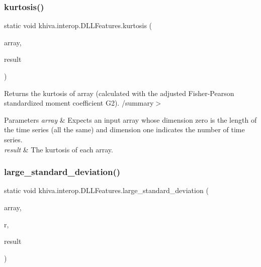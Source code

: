 \mbox{\label{classkhiva_1_1interop_1_1_d_l_l_features_a97470f56bfa5bd147e77adeab9bb6873}} 
\subsubsection{\texorpdfstring{kurtosis()}{kurtosis()}}
{\footnotesize\ttfamily static void khiva.\+interop.\+D\+L\+L\+Features.\+kurtosis (\begin{DoxyParamCaption}\item[{\mbox{[}\+In\mbox{]} ref Int\+Ptr}]{array,  }\item[{\mbox{[}\+Out\mbox{]} out Int\+Ptr}]{result }\end{DoxyParamCaption})\hspace{0.3cm}{\ttfamily [static]}}



Returns the kurtosis of array (calculated with the adjusted Fisher-\/\+Pearson standardized moment coefficient G2). /summary$>$ 
\begin{DoxyParams}{Parameters}
{\em array} & Expects an input array whose dimension zero is the length of the time series (all the same) and dimension one indicates the number of time series.\\
\hline
{\em result} & The kurtosis of each array.\\
\hline
\end{DoxyParams}


\mbox{\label{classkhiva_1_1interop_1_1_d_l_l_features_a9c7f3b29bebee0b1fa4b091d27390cf8}} 
\subsubsection{\texorpdfstring{large\+\_\+standard\+\_\+deviation()}{large\_standard\_deviation()}}
{\footnotesize\ttfamily static void khiva.\+interop.\+D\+L\+L\+Features.\+large\+\_\+standard\+\_\+deviation (\begin{DoxyParamCaption}\item[{\mbox{[}\+In\mbox{]} ref Int\+Ptr}]{array,  }\item[{\mbox{[}\+In\mbox{]} ref float}]{r,  }\item[{\mbox{[}\+Out\mbox{]} out Int\+Ptr}]{result }\end{DoxyParamCaption})\hspace{0.3cm}{\ttfamily [static]}}



